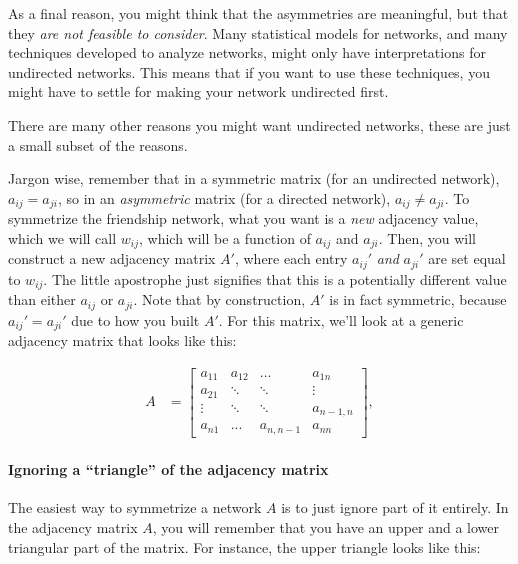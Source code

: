As a final reason, you might think that the asymmetries are meaningful, but that they \emph{are not feasible to consider}. Many statistical models for networks, and many techniques developed to analyze networks, might only have interpretations for undirected networks. This means that if you want to use these techniques, you might have to settle for making your network undirected first. 

There are many other reasons you might want undirected networks, these are just a small subset of the reasons.

Jargon wise, remember that in a symmetric matrix (for an undirected network), $a_{ij} = a_{ji}$, so in an \emph{asymmetric} matrix (for a directed network), $a_{ij} \neq a_{ji}$. To symmetrize the friendship network, what you want is a \emph{new} adjacency value, which we will call $w_{ij}$, which will be a function of $a_{ij}$ and $a_{ji}$. Then, you will construct a new adjacency matrix $A'$, where each entry $a_{ij}'$ \emph{and} $a_{ji}'$ are set equal to $w_{ij}$.  The little apostrophe just signifies that this is a potentially different value than either $a_{ij}$ or $a_{ji}$. Note that by construction, $A'$ is in fact symmetric, because $a_{ij}' = a_{ji}'$ due to how you built $A'$. For this matrix, we'll look at a generic adjacency matrix that looks like this:

\begin{align*}
    A &= \begin{bmatrix}
        a_{11} & {a_{12}} & {...} & {a_{1n}} \\
        {a_{21}} & \ddots & {\ddots} & {\vdots} \\
        {\vdots} &{\ddots} &\ddots & {a_{n-1, n}}\\
        {a_{n1}} & {...} & {a_{n,n-1}} & a_{nn}
    \end{bmatrix},
\end{align*}

\paragraph{Ignoring a ``triangle'' of the adjacency matrix}

The easiest way to symmetrize a network $A$ is to just ignore part of it entirely. In the adjacency matrix $A$, you will remember that you have an upper and a lower triangular part of the matrix. For instance, the upper triangle looks like this:

